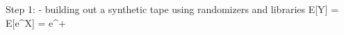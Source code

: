 
Step 1: 
- building out a synthetic tape using randomizers and libraries
  E[Y] = E[e^X] = e^{\mu + }
  
